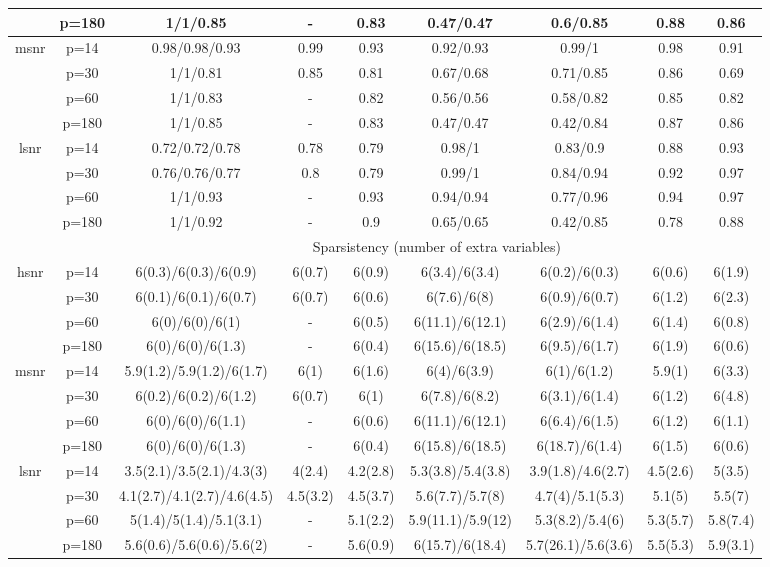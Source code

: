 \begin{table}[ht]
{\begin{tabular}{|c|c|ccccccc|}
   & p=180 & 1/1/0.85 & - & 0.83 & 0.47/0.47 & 0.6/0.85 & 0.88 & 0.86 \\ 
  \midrule\multirow{4}[2]{*}{msnr} & p=14 & 0.98/0.98/0.93 & 0.99 & 0.93 & 0.92/0.93 & 0.99/1 & 0.98 & 0.91 \\ 
   & p=30 & 1/1/0.81 & 0.85 & 0.81 & 0.67/0.68 & 0.71/0.85 & 0.86 & 0.69 \\ 
   & p=60 & 1/1/0.83 & - & 0.82 & 0.56/0.56 & 0.58/0.82 & 0.85 & 0.82 \\ 
   & p=180 & 1/1/0.85 & - & 0.83 & 0.47/0.47 & 0.42/0.84 & 0.87 & 0.86 \\ 
  \midrule\multirow{4}[2]{*}{lsnr} & p=14 & 0.72/0.72/0.78 & 0.78 & 0.79 & 0.98/1 & 0.83/0.9 & 0.88 & 0.93 \\ 
   & p=30 & 0.76/0.76/0.77 & 0.8 & 0.79 & 0.99/1 & 0.84/0.94 & 0.92 & 0.97 \\ 
   & p=60 & 1/1/0.93 & - & 0.93 & 0.94/0.94 & 0.77/0.96 & 0.94 & 0.97 \\ 
   & p=180 & 1/1/0.92 & - & 0.9 & 0.65/0.65 & 0.42/0.85 & 0.78 & 0.88 \\ 
   \midrule 
 \multicolumn{1}{|c}{} &       & \multicolumn{7}{c|}{Sparsistency (number of extra variables)} \\
\midrule\multirow{4}[2]{*}{hsnr} & p=14 & 6(0.3)/6(0.3)/6(0.9) & 6(0.7) & 6(0.9) & 6(3.4)/6(3.4) & 6(0.2)/6(0.3) & 6(0.6) & 6(1.9) \\ 
   & p=30 & 6(0.1)/6(0.1)/6(0.7) & 6(0.7) & 6(0.6) & 6(7.6)/6(8) & 6(0.9)/6(0.7) & 6(1.2) & 6(2.3) \\ 
   & p=60 & 6(0)/6(0)/6(1) & - & 6(0.5) & 6(11.1)/6(12.1) & 6(2.9)/6(1.4) & 6(1.4) & 6(0.8) \\ 
   & p=180 & 6(0)/6(0)/6(1.3) & - & 6(0.4) & 6(15.6)/6(18.5) & 6(9.5)/6(1.7) & 6(1.9) & 6(0.6) \\ 
  \midrule\multirow{4}[2]{*}{msnr} & p=14 & 5.9(1.2)/5.9(1.2)/6(1.7) & 6(1) & 6(1.6) & 6(4)/6(3.9) & 6(1)/6(1.2) & 5.9(1) & 6(3.3) \\ 
   & p=30 & 6(0.2)/6(0.2)/6(1.2) & 6(0.7) & 6(1) & 6(7.8)/6(8.2) & 6(3.1)/6(1.4) & 6(1.2) & 6(4.8) \\ 
   & p=60 & 6(0)/6(0)/6(1.1) & - & 6(0.6) & 6(11.1)/6(12.1) & 6(6.4)/6(1.5) & 6(1.2) & 6(1.1) \\ 
   & p=180 & 6(0)/6(0)/6(1.3) & - & 6(0.4) & 6(15.8)/6(18.5) & 6(18.7)/6(1.4) & 6(1.5) & 6(0.6) \\ 
  \midrule\multirow{4}[2]{*}{lsnr} & p=14 & 3.5(2.1)/3.5(2.1)/4.3(3) & 4(2.4) & 4.2(2.8) & 5.3(3.8)/5.4(3.8) & 3.9(1.8)/4.6(2.7) & 4.5(2.6) & 5(3.5) \\ 
   & p=30 & 4.1(2.7)/4.1(2.7)/4.6(4.5) & 4.5(3.2) & 4.5(3.7) & 5.6(7.7)/5.7(8) & 4.7(4)/5.1(5.3) & 5.1(5) & 5.5(7) \\ 
   & p=60 & 5(1.4)/5(1.4)/5.1(3.1) & - & 5.1(2.2) & 5.9(11.1)/5.9(12) & 5.3(8.2)/5.4(6) & 5.3(5.7) & 5.8(7.4) \\ 
   & p=180 & 5.6(0.6)/5.6(0.6)/5.6(2) & - & 5.6(0.9) & 6(15.7)/6(18.4) & 5.7(26.1)/5.6(3.6) & 5.5(5.3) & 5.9(3.1) \\ 
   \bottomrule 
\end{tabular}
}
\end{table}
